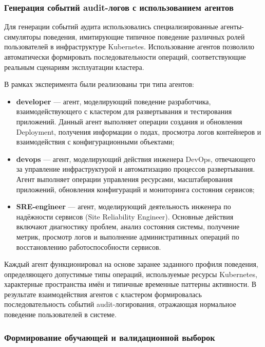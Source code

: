 \subsubsection{Генерация событий audit-логов с использованием агентов}

Для генерации событий аудита использовались специализированные агенты-симуляторы поведения, имитирующие типичное поведение различных ролей пользователей в инфраструктуре Kubernetes. Использование агентов позволило автоматически формировать последовательности операций, соответствующие реальным сценариям эксплуатации кластера.

В рамках эксперимента были реализованы три типа агентов:

\begin{itemize}
    \item \textbf{developer} — агент, моделирующий поведение разработчика, взаимодействующего с кластером для развертывания и тестирования приложений. Данный агент выполняет операции создания и обновления Deployment, получения информации о подах, просмотра логов контейнеров и взаимодействия с конфигурационными объектами;
    \item \textbf{devops} — агент, моделирующий действия инженера DevOps, отвечающего за управление инфраструктурой и автоматизацию процессов развертывания. Агент выполняет операции управления ресурсами, масштабирования приложений, обновления конфигураций и мониторинга состояния сервисов;
    \item \textbf{SRE-engineer} — агент, моделирующий деятельность инженера по надёжности сервисов (Site Reliability Engineer). Основные действия включают диагностику проблем, анализ состояния системы, получение метрик, просмотр логов и выполнение административных операций по восстановлению работоспособности сервисов.
\end{itemize}

Каждый агент функционировал на основе заранее заданного профиля поведения, определяющего допустимые типы операций, используемые ресурсы Kubernetes, характерные пространства имён и типичные временные паттерны активности. В результате взаимодействия агентов с кластером формировалась последовательность событий audit-логирования, отражающая нормальное поведение пользователей в системе.

\subsubsection{Формирование обучающей и валидационной выборок}

